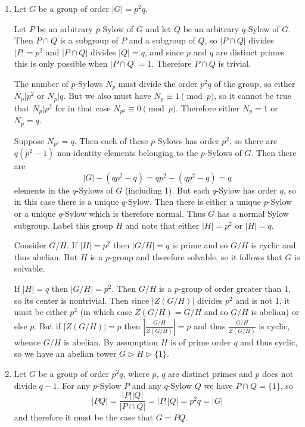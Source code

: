 \documentclass{article}
\begin{document}
\begin{Answer}
\begin{enumerate}
  \item{
    Let $G$ be a group of order $|G| = p^2 q$.

    Let $P$ be an arbitrary $p$-Sylow of $G$ and let $Q$ be an
    arbitrary $q$-Sylow of $G$. Then $P \cap Q$ is a subgroup of $P$
    and a subgroup of $Q$, so $|P \cap Q|$ divides $|P| = p^2$ and
    $|P \cap Q|$ divides $|Q| = q$, and since $p$ and $q$ are distinct
    primes this is only possible when $|P \cap Q| = 1$. Therefore $P
    \cap Q$ is trivial.

    The number of $p$-Sylows $N_{p}$ must divide the order $p^2q$ of the
    group, so either $N_{p} \vert p^2$ or $N_{p} \vert q$. But
    we also must have $N_{p} \equiv 1 \pmod{p}$, so it cannot be true
    that $N_{p} \vert p^2$ for in that case $N_{p^2} \equiv 0
    \pmod{p}$.
    Therefore either $N_{p} = 1$ or $N_{p} = q$.

    Suppose $N_{p^2} = q$. Then each of these $p$-Sylows has order
    $p^2$, so there are $q (p^2 - 1)$ non-identity elements belonging
    to the $p$-Sylows of $G$. Then there are
    $$
    |G| - (qp^2 - q) = qp^2 - (qp^2 - q) = q
    $$
    elements in the $q$-Sylows of $G$ (including 1). But each $q$-Sylow has order
    $q$, so in this case there is a unique $q$-Sylow. Then there
    is either a unique $p$-Sylow or a unique $q$-Sylow which is
    therefore normal. Thus $G$ has a normal Sylow subgroup.
    Label this group $H$ and note that either $|H| = p^2$ or
    $|H| = q$.

    Consider $G / H$. If $|H| = p^2$ then $|G / H| = q$ is prime and
    so $G / H$ is cyclic and thus abelian. But $H$ is a $p$-group and
    therefore solvable, so it follows that $G$ is solvable.

    If $|H| = q$ then $|G / H| = p^2$. Then $G / H$ is a $p$-group of
    order greater than 1, so its
    center is nontrivial. Then since $|Z(G / H)|$ divides $p^2$ and is
    not 1, it must be either $p^2$ (in which case $Z(G / H) = G / H$ and so
    $G / H$ is abelian) or else $p$. But if $|Z(G / H)| = p$ then
    $\left|\frac{G / H}{Z(G / H)}\right| = p$ and thus
    $\frac{G / H}{Z(G / H)}$ is cyclic, whence $G / H$ is abelian. By
    assumption $H$ is of prime order $q$ and thus cyclic, so we have an
    abelian tower $G \triangleright H \triangleright \{ 1 \}$.
  }
  \item
  {
    Let $G$ be a group of order $p^2 q$, where $p$, $q$ are distinct
    primes and $p$ does not divide $q-1$. For any $p$-Sylow $P$
    and any $q$-Sylow $Q$ we have $P \cap Q = \{ 1 \}$, so
    $$
    |PQ| = \frac{|P||Q|}{|P \cap Q|} = |P||Q| = p^2 q = |G|
    $$
    and therefore it must be the case that $G = PQ$.

}
\end{enumerate}
\end{Answer}
\end{document}
